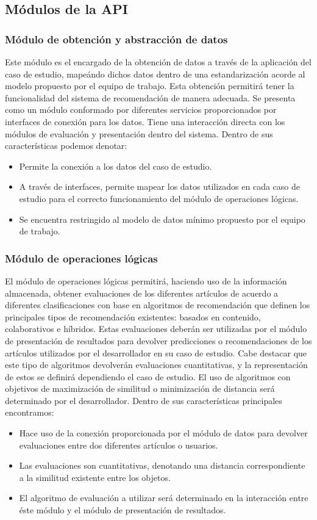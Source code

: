 \subsection{Módulos de la API}
  \subsubsection{Módulo de obtención y abstracción de datos}
    Este módulo es el encargado de la obtención de datos a través de la aplicación del caso de estudio, mapeándo dichos datos dentro de una estandarización acorde al modelo propuesto por el equipo de trabajo. Esta obtención permitirá tener la funcionalidad del sistema de recomendación de manera adecuada. 
    Se presenta como un módulo conformado por diferentes servicios proporcionados por interfaces de conexión para los datos. Tiene una interacción directa con los módulos de evaluación y presentación dentro del sistema.
    Dentro de sus características podemos denotar:
    \begin{itemize}
      \item Permite la conexión a los datos del caso de estudio.
      \item A través de interfaces, permite mapear los datos utilizados en cada caso de estudio para el correcto funcionamiento del módulo de operaciones lógicas.
      \item Se encuentra restringido al modelo de datos mínimo propuesto por el equipo de trabajo.
    \end{itemize}

  \subsubsection{Módulo de operaciones lógicas}
    El módulo de operaciones lógicas permitirá, haciendo uso de la información almacenada, obtener evaluaciones de los diferentes artículos de acuerdo a diferentes clasificaciones con base en algoritmos de recomendación que definen los principales tipos de recomendación existentes: basados en contenido, colaborativos e híbridos. Estas evaluaciones deberán ser utilizadas por el módulo de presentación de resultados para devolver predicciones o recomendaciones de los artículos utilizados por el desarrollador en su caso de estudio. Cabe destacar que este tipo de algoritmos devolverán evaluaciones cuantitativas, y la representación de estos se definirá dependiendo el caso de estudio. El uso de algoritmos con objetivos de maximización de similitud o minimización de distancia será determinado por el desarrollador. Dentro de sus características principales encontramos:
    \begin{itemize}
      \item Hace uso de la conexión proporcionada por el módulo de datos para devolver evaluaciones entre dos diferentes artículos o usuarios.
      \item Las evaluaciones son cuantitativas, denotando una distancia correspondiente a la similitud existente entre los objetos.
      \item El algoritmo de evaluación a utilizar será determinado en la interacción entre éste módulo y el módulo de presentación de resultados.
    \end{itemize}


